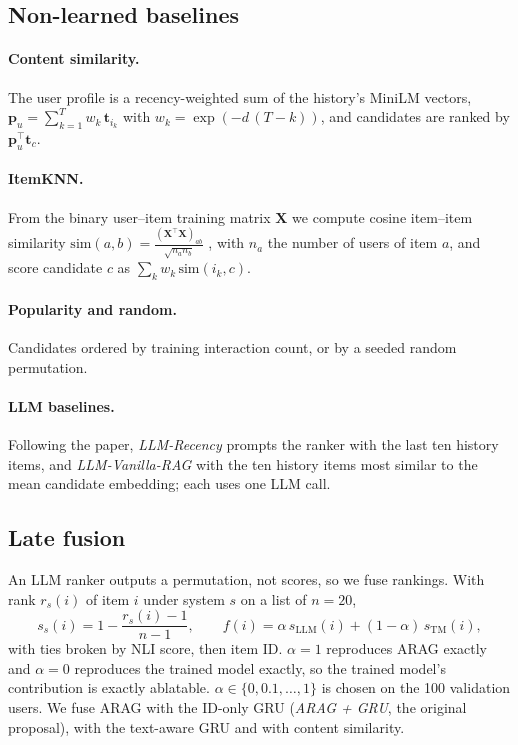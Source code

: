 \documentclass[11pt,a4paper]{article}
\begin{document}
\subsection{Non-learned baselines}

\paragraph{Content similarity.} The user profile is a recency-weighted sum of the history's MiniLM
vectors, $\mathbf{p}_u=\sum_{k=1}^{T} w_k\,\mathbf{t}_{i_k}$ with $w_k=\exp(-d\,(T-k))$, and
candidates are ranked by $\mathbf{p}_u^{\top}\mathbf{t}_c$.

\paragraph{ItemKNN.} From the binary user--item training matrix $\mathbf{X}$ we compute cosine
item--item similarity $\mathrm{sim}(a,b)=\frac{(\mathbf{X}^{\top}\mathbf{X})_{ab}}{\sqrt{n_a n_b}}$
\citep{sarwar2001item}, with $n_a$ the number of users of item $a$, and score candidate $c$ as
$\sum_k w_k\,\mathrm{sim}(i_k,c)$.

\paragraph{Popularity and random.} Candidates ordered by training interaction count, or by a
seeded random permutation.

\paragraph{LLM baselines.} Following the paper, \emph{LLM-Recency} prompts the ranker with the
last ten history items, and \emph{LLM-Vanilla-RAG} with the ten history items most similar to the
mean candidate embedding; each uses one LLM call.

\subsection{Late fusion}
\label{sec:fusion}

An LLM ranker outputs a permutation, not scores, so we fuse rankings. With rank $r_s(i)$ of item
$i$ under system $s$ on a list of $n=20$,
\begin{equation}
  s_s(i) = 1 - \frac{r_s(i)-1}{n-1}, \qquad
  f(i) = \alpha\, s_{\mathrm{LLM}}(i) + (1-\alpha)\, s_{\mathrm{TM}}(i),
  \label{eq:fusion}
\end{equation}
with ties broken by NLI score, then item ID. $\alpha=1$ reproduces ARAG exactly and $\alpha=0$
reproduces the trained model exactly, so the trained model's contribution is exactly ablatable.
$\alpha\in\{0,0.1,\dots,1\}$ is chosen on the 100 validation users. We fuse ARAG with the ID-only
GRU (\emph{ARAG + GRU}, the original proposal), with the text-aware GRU and with content
similarity.
\end{document}
